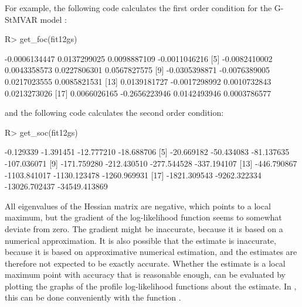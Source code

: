 \documentclass[nojss]{jss} %
\begin{document}
For example, the following code calculates the first order condition for the G-StMVAR model :
%
\begin{Schunk}
\begin{Sinput}
R> get_foc(fit12gs)
\end{Sinput}
\begin{Soutput}
 [1] -0.0006134447  0.0137299025  0.0098887109 -0.0011046216
 [5] -0.0082410002  0.0043358573  0.0227806301  0.0567827575
 [9] -0.0305398871 -0.0076389005  0.0217023555  0.0085821531
[13]  0.0139181727 -0.0017298992  0.0010732843  0.0213273026
[17]  0.0066026165 -0.2656223946  0.0142493946  0.0003786577
\end{Soutput}
\end{Schunk}
%
and the following code calculates the second order condition:
%
\begin{Schunk}
\begin{Sinput}
R> get_soc(fit12gs)
\end{Sinput}
\begin{Soutput}
 [1]     -0.129339     -1.391451    -12.777210    -18.688706
 [5]    -20.669182    -50.434083    -81.137635   -107.036071
 [9]   -171.759280   -212.430510   -277.544528   -337.194107
[13]   -446.790867  -1103.841017  -1130.123478  -1260.969931
[17]  -1821.309543  -9262.322334 -13026.702437 -34549.413869
\end{Soutput}
\end{Schunk}
%
All eigenvalues of the Hessian matrix are negative, which points to a local maximum, but the gradient of the log-likelihood function seems to somewhat deviate from zero. The gradient might be inaccurate, because it is based on a numerical approximation. It is also possible that the estimate is inaccurate, because it is based on approximative numerical estimation, and the estimates are therefore not expected to be exactly accurate. Whether the estimate is a local maximum point with accuracy that is reasonable enough, can be evaluated by plotting the graphs of the profile log-likelihood functions about the estimate. In , this can be done conveniently with the function .
\end{document}
